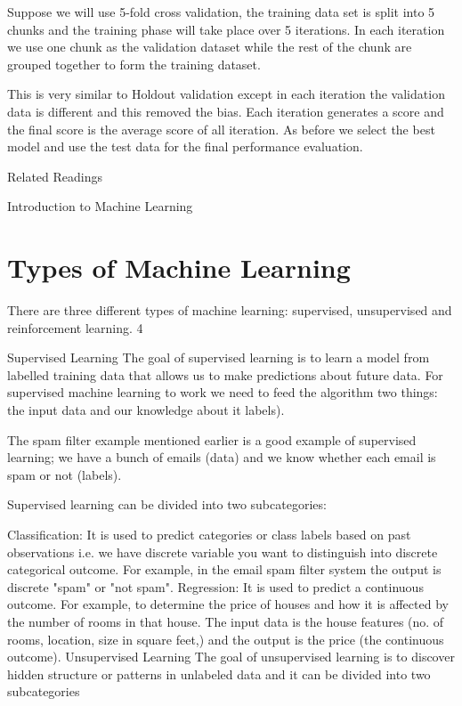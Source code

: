 Suppose we will use 5-fold cross validation, the training data set is split into 5 chunks and the training phase will take place over 5 iterations. In each iteration we use one chunk as the validation dataset while the rest of the chunk are grouped together to form the training dataset.

This is very similar to Holdout validation except in each iteration the validation data is different and this removed the bias. Each iteration generates a score and the final score is the average score of all iteration. As before we select the best model and use the test data for the final performance evaluation.

Related Readings

Introduction to Machine Learning

\section{Types of Machine Learning}

There are three different types of machine learning: supervised, unsupervised and reinforcement learning. 4

Supervised Learning
The goal of supervised learning is to learn a model from labelled training data that allows us to make predictions about future data. For supervised machine learning to work we need to feed the algorithm two things: the input data and our knowledge about it labels).

The spam filter example mentioned earlier is a good example of supervised learning; we have a bunch of emails (data) and we know whether each email is spam or not (labels).



Supervised learning can be divided into two subcategories:

Classification: It is used to predict categories or class labels based on past observations i.e. we have discrete variable you want to distinguish into discrete categorical outcome. For example, in the email spam filter system the output is discrete "spam" or "not spam".
Regression: It is used to predict a continuous outcome. For example, to determine the price of houses and how it is affected by the number of rooms in that house. The input data is the house features (no. of rooms, location, size in square feet,) and the output is the price (the continuous outcome).
Unsupervised Learning
The goal of unsupervised learning is to discover hidden structure or patterns in unlabeled data and it can be divided into two subcategories

